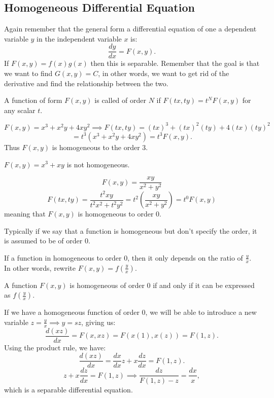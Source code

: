 \documentclass[../main/main.tex]{subfiles}
\begin{document}
\subsection{Homogeneous Differential Equation}
Again remember that the general form a differential equation of one a dependent variable $y$ in the independent variable  $x$ is:  \[
	\frac{dy}{dx} = F(x,y)
.\] If $F(x,y)=f(x)g(x)$ then this is separable. Remember that the goal is that we want to find $G(x,y)=C$, in other words, we want to get rid of the derivative and find the relationship between the two.

\begin{definition}
	A function of form $F(x,y)$ is called  of order  $N$ if $F(tx,ty)=t^{N}F(x,y)$ for any scalar $t$.
\end{definition}
\begin{example}
	\[
		F(x,y) = x^{3}+x^2y+4xy^{2} \implies F(tx,ty) = (tx)^{3}+(tx)^2(ty)+4(tx)(ty)^{2}
	\] \[
	=t^{3}\left( x^{3}+x^2y+4xy^2 \right) =t^{3}F(x,y)
.\] Thus $F(x,y)$ is homogeneous to the order 3.
\end{example}
\begin{example}
	$F(x,y)=x^{3}+xy$ is not homogeneous. 
\end{example}
\begin{example}
	\[
		F(x,y)=\frac{xy}{x^2+y^2}
	\]\[
	F(tx,ty)=\frac{t^2xy}{t^2x^2+t^2y^2}= t^2\left( \frac{xy}{x^2+y^2} \right) = t^{0}F(x,y)
\] meaning that $F(x,y)$ is homogeneous to order 0.   
\end{example}
\begin{remark}
	Typically if we say that a function is homogeneous but don't specify the order, it is assumed to be of order 0.
\end{remark}
If a function in homogeneous to order 0, then it only depends on the ratio of $\frac{y}{x}$. In other words, rewrite $F(x,y)=f(\frac{y}{x})$.
\begin{theorem}
	A function $F(x,y)$ is homogeneous of order 0 if and only if it can be expressed as $f(\frac{y}{x})$.
\end{theorem}
If we have a homogeneous function of order 0, we will be able to introduce a new variable $z=\frac{y}{x}\implies y=sz$, giving us: \[
	\frac{d(xz)}{dx}=F(x,xz)=F(x(1),x(z))=F(1,z)
.\] Using the product rule, we have: \[
\frac{d(xz)}{dx}=\frac{dx}{dx}z+x \frac{dz}{dx}=F(1,z)
.\] \[
z+x \frac{dz}{dx}=F(1,z) \implies \frac{dz}{F(1,z)-z}=\frac{dx}{x}
,\] which is a separable differential equation. 
\end{document}
